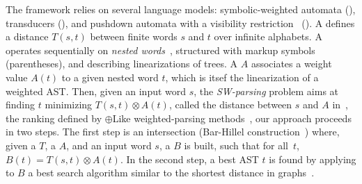 The framework relies on several language models:
symbolic-weighted automata (\SWA),
transducers (\SWT), and pushdown automata
with a visibility restriction~\cite{AlurMadhusudan09nested} (\SWVPA).
A \SWT defines a distance $T(s, t)$ between finite words $s$ and $t$
over infinite alphabets. %
A  \SWVPA operates sequentially on \emph{nested words}~\cite{AlurMadhusudan09nested},
structured with markup symbols (parentheses), and describing linearizations of trees.
A \SWVPA $A$ associates a weight value $A(t)$ %
to a given nested word $t$, which is itsef the linearization of a weighted AST. %
%
Then, given an input word $s$, the \emph{SW-parsing} problem aims at
finding $t$ minimizing
$T(s, t) \otimes A(t)$, called the distance between $s$ and $A$ in~\cite{Mohri03EDWA},
\wrt the ranking defined by $\oplus$Like weighted-parsing
methods~\cite{Goodman99SemiringParsing,Nederhof03weightedParsing,MorbitzVogler19weighted-parsing},
our approach proceeds in two steps.
The first step is an intersection
(Bar-Hillel construction~\cite{GruneJacobs08parsing})
where, given a \SWT $T$, a \SWVPA $A$, and an input word $s$,
a \SWVPA $B$ %
is built, such that for all~$t$,
$B(t) = T(s, t) \otimes A(t)$.%
In the second step, a best AST $t$ is found by applying to $B$ %
a best search algorithm similar to the shortest distance
in graphs~\cite{Mohri02semiring,Huang05kbest}.
%

